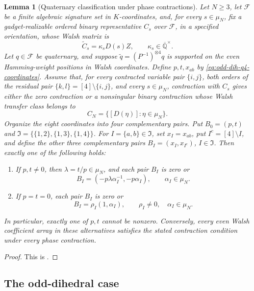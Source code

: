 \documentclass[11pt,letterpaper,onecolumn]{article}
\theoremstyle{plain}
\newtheorem{lemma}[lemma]{Lemma}
\theoremstyle{definition}
\theoremstyle{remark}
\newcommand{\AlgNums}{\overline{\mathbb Q}}
\newcommand{\cF}{\mathcal F}
\begin{document}
	\begin{lemma}[Quaternary classification under phase contractions]
		\label{lem:odd-cyc-q4-family}
		Let \(N\ge3\), let \(\cF\) be a finite algebraic signature set in
		\(K\)-coordinates, and, for every \(s\in\mu_N\), fix a gadget-realizable ordered binary representative \(C_s\) over \(\cF\), in a specified orientation,
		whose Walsh matrix is
		\[
		\widetilde C_s=\kappa_sD(s)Z,
		\qquad \kappa_s\in\AlgNums^\times.
		\]
		Let \(q\in\cF\) be quaternary, and
		suppose \(\widetilde q=(P^{-1})^{\otimes4}q\) is supported on the even Hamming-weight
		positions in Walsh coordinates.  Define \(p,t,x_{ab}\) by
		\cref{eq:odd-dih-q4-coordinates}.  Assume that, for every contracted variable pair \(\{i,j\}\),
		both orders of the residual pair \(\{k,l\}=[4]\setminus\{i,j\}\),
		and every \(s\in\mu_N\), contraction
		with \(C_s\) gives either the zero contraction or a nonsingular binary contraction whose
		Walsh transfer class belongs to
		\[
		C_N=\{[D(\eta)]:\eta\in\mu_N\}.
		\]
		Organize the eight
		coordinates into four complementary pairs.  Put \(B_0=(p,t)\) and
		\(\mathfrak I=\{\{1,2\},\{1,3\},\{1,4\}\}\).
		For \(I=\{a,b\}\in\mathfrak I\), set \(x_I=x_{ab}\),
		put \(I^c=[4]\setminus I\), and define
		the other three complementary pairs \(B_I=(x_I,x_{I^c})\),
        \(I\in\mathfrak I\). Then exactly one of the following holds:
		\begin{enumerate}
			\item If \(p,t\ne0\), then \(\lambda=t/p\in\mu_N\), and each pair \(B_I\)
			is zero or
			\begin{equation}
				B_I=(-p\lambda\alpha_I^{-1},-p\alpha_I),
				\qquad \alpha_I\in\mu_N.
				\label{eq:odd-cyc-q4-nonzero-endpoints}
			\end{equation}
			\item If \(p=t=0\), each pair \(B_I\) is zero or
			\[
			B_I=\rho_I(1,\alpha_I),
			\qquad \rho_I\ne0,
			\quad \alpha_I\in\mu_N.
			\]
		\end{enumerate}
		In particular, exactly one of \(p,t\) cannot be nonzero.
		Conversely, every even Walsh coefficient array in these alternatives satisfies the
		stated contraction condition under every phase contraction.
	\end{lemma}
	
	\begin{proof}
		This is \cite[Lemma~7.2]{Liu2026DEQ2Holant}.
	\end{proof}
	
	\subsection{The odd-dihedral case}
	\label{proofsec:odd-dihedral}
\end{document}
